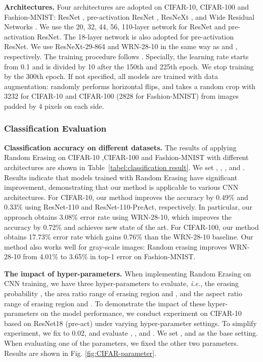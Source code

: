 \documentclass[10pt,twocolumn,letterpaper]{article}
\begin{document}
\textbf{Architectures.} Four architectures are adopted on CIFAR-10, CIFAR-100 and Fashion-MNIST: ResNet \cite{resnet}, pre-activation ResNet \cite{he2016identity}, ResNeXt \cite{xie2016aggregated}, and Wide Residual Networks \cite{zagoruyko2016wide}. We use the 20, 32, 44, 56, 110-layer network for ResNet and pre-activation ResNet. The 18-layer network is also adopted for pre-activation ResNet. We use ResNeXt-29-864 and WRN-28-10 in the same way as \cite{xie2016aggregated} and \cite{zagoruyko2016wide}, respectively.  
The training procedure follows \cite{resnet}. Specially, the learning rate
starts from 0.1 and is divided by 10 after the 150th and 225th epoch. We stop training by the 300th epoch. If not specified, all models are trained with data augmentation: randomly performs horizontal flips, and takes a random crop with 3232 for CIFAR-10 and CIFAR-100 (2828 for Fashion-MNIST) from images padded by 4 pixels on each side. 


\subsubsection{Classification Evaluation}
\label{Classification Evaluation}
\textbf{Classification accuracy on different datasets.}
The results of applying Random Erasing on CIFAR-10 ,CIFAR-100 and Fashion-MNIST with different architectures are shown in Table~\ref{tabel:classification result}. We set , , , and . Results indicate that models trained with Random Erasing have significant improvement, demonstrating that our method is applicable to various CNN architectures. For CIFAR-10, our method improves the accuracy by 0.49\% and 0.33\% using ResNet-110 and ResNet-110-PreAct, respectively. In particular, our approach obtains 3.08\% error rate  using WRN-28-10, which improves the accuracy by 0.72\% and achieves new state of the art. For CIFAR-100, our method obtains 17.73\% error rate which gains 0.76\% than the WRN-28-10 baseline. Our method  also works well for gray-scale images: Random erasing improves WRN-28-10 from 4.01\% to 3.65\% in top-1 error on Fashion-MNIST.

\textbf{The impact of hyper-parameters.} When implementing Random Erasing on CNN training, we have three hyper-parameters to evaluate, \emph{i.e.}, the erasing probability , the area ratio range of erasing region   and , and the aspect ratio range of erasing region  and . To demonstrate the impact of these hyper-parameters on the model performance, we conduct experiment on CIFAR-10 based on ResNet18 (pre-act) under varying hyper-parameter settings. To simplify experiment, we fix  to 0.02,  and evaluate , , and . We set ,  and  as the base setting.  When evaluating one of the parameters, we fixed the other two parameters. Results are shown in Fig. \ref{fig:CIFAR-parameter}.
\end{document}
